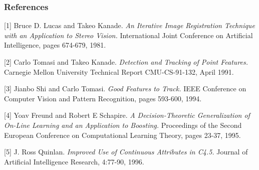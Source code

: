 \documentclass{article} %
\begin{document}

\subsubsection*{References}


\small{
[1] Bruce D. Lucas and Takeo Kanade. {\it An Iterative Image Registration Technique with an Application to Stereo Vision.} International Joint Conference on Artificial Intelligence, pages 674-679, 1981.

[2] Carlo Tomasi and Takeo Kanade. {\it Detection and Tracking of Point Features.} Carnegie Mellon University Technical Report CMU-CS-91-132, April 1991.

[3] Jianbo Shi and Carlo Tomasi. {\it Good Features to Track.} IEEE Conference on Computer Vision and Pattern Recognition, pages 593-600, 1994.

[4] Yoav Freund and Robert E Schapire. {\it A Decision-Theoretic Generalization of On-Line Learning and an Application to Boosting.} Proceedings of the Second European Conference on Computational Learning Theory, pages 23-37, 1995.

[5] J. Ross Quinlan. {\it Improved Use of Continuous Attributes in C4.5.} Journal of Artificial Intelligence Research, 4:77-90, 1996.
}
\end{document}
